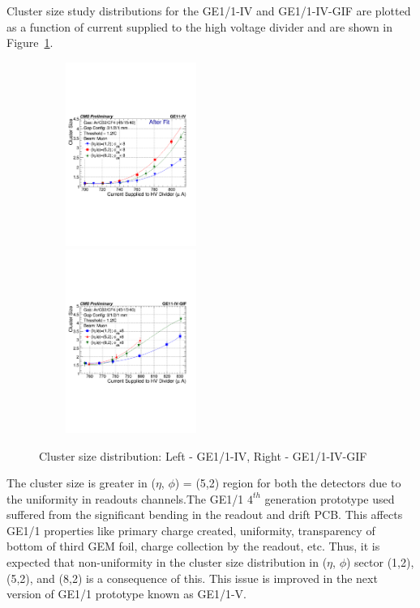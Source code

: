 Cluster size study distributions for the GE1/1-IV and GE1/1-IV-GIF are plotted as a function of current supplied to the high voltage divider and are shown in Figure~\ref{fig:CSDGE1/1}.
\begin{figure}[!htbp]
   \begin{center}
     \includegraphics[width=6cm,height=6cm]{figures/GEM/CurrentvsClusterSizeAll3EtaPhi.pdf}%
     \includegraphics[width=6cm,height=6cm]{figures/GEM/CurrentvsClusterSizeAll3EtaPhiGE11IVGIF.pdf}
   \end{center}
   \caption{Cluster size distribution: Left - GE1/1-IV, Right - GE1/1-IV-GIF}
   \label{fig:CSDGE1/1}
\end{figure}
The cluster size is greater in ($\eta$, $\phi$) = (5,2) region for both the detectors due to the uniformity in readouts channels.The GE1/1 $4^{th}$ generation prototype used suffered from the significant bending in the readout and drift PCB. This affects GE1/1 properties like primary charge created, uniformity, transparency of bottom of third GEM foil, charge collection by the readout, etc. Thus, it is expected that non-uniformity in the cluster size distribution in ($\eta$, $\phi$) sector (1,2), (5,2), and (8,2) is a consequence of this. This issue is improved in the next version of GE1/1 prototype known as GE1/1-V.

